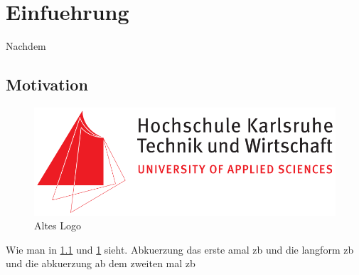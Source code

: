 \chapter{Einfuehrung}
\label{CH:1}
Nachdem
\section{Motivation}

\begin{figure}[t]
            \centering
		\includegraphics[width=1\textwidth]{Images/Template/HsKa_old.jpg}
		\caption[Hka]{Altes Logo\cite{einstein}}
		\label{fig:structure}
\end{figure}
Wie man in \ref{fig:structure} und \ref{CH:1} sieht.
Abkuerzung das erste amal \ac{zb} und die langform \acl{zb} und die abkuerzung ab dem zweiten mal \ac{zb}